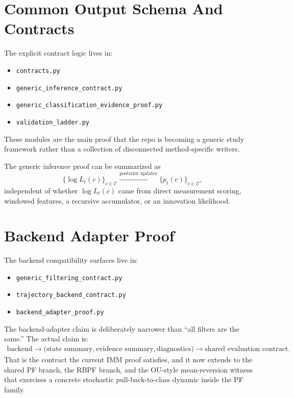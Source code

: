 \documentclass[11pt]{article}
\begin{document}
\section{Common Output Schema And Contracts}

The explicit contract logic lives in:
\begin{itemize}[leftmargin=1.5em]
    \item \texttt{contracts.py}
    \item \texttt{generic\_inference\_contract.py}
    \item \texttt{generic\_classification\_evidence\_proof.py}
    \item \texttt{validation\_ladder.py}
\end{itemize}

These modules are the main proof that the repo is becoming a generic study
framework rather than a collection of disconnected method-specific writers.

The generic inference proof can be summarized as
\begin{equation}
    \{\log L_t(c)\}_{c \in \mathcal{C}}
    \xrightarrow{\text{posterior updater}}
    \{p_t(c)\}_{c \in \mathcal{C}},
\end{equation}
independent of whether \(\log L_t(c)\) came from direct measurement scoring,
windowed features, a recursive accumulator, or an innovation likelihood.

\section{Backend Adapter Proof}

The backend compatibility surfaces live in:
\begin{itemize}[leftmargin=1.5em]
    \item \texttt{generic\_filtering\_contract.py}
    \item \texttt{trajectory\_backend\_contract.py}
    \item \texttt{backend\_adapter\_proof.py}
\end{itemize}

The backend-adapter claim is deliberately narrower than ``all filters are the
same.'' The actual claim is:
\begin{align}
    \text{backend}
    \rightarrow
    \big(
        \text{state summary},
        \text{evidence summary},
        \text{diagnostics}
    \big)
    \rightarrow
    \text{shared evaluation contract}.
\end{align}
That is the contract the current IMM proof satisfies, and it now extends to the
shared PF branch, the RBPF branch, and the OU-style mean-reversion witness that
exercises a concrete stochastic pull-back-to-class dynamic inside the PF family.
\end{document}
